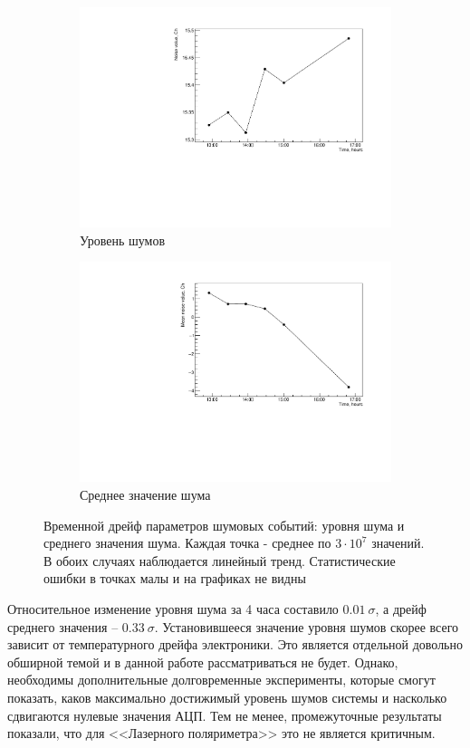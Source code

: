 \begin{figure}[h]
	\centering
	\begin{subfigure}{.5\textwidth}
		\centering
		\includegraphics[width=1\linewidth]{img/Noise_time_drift.pdf}
		\caption{Уровень шумов}
	\end{subfigure}%
	\begin{subfigure}{.5\textwidth}
		\centering
		\includegraphics[width=1\linewidth]{img/Mean_time_drift.pdf}
		\caption{Среднее значение шума}
	\end{subfigure}
	\caption{Временной дрейф параметров шумовых событий: уровня шума и среднего значения шума. Каждая точка - среднее по $3\cdot10^7$ значений. В обоих случаях наблюдается линейный тренд. Статистические ошибки в точках малы и на графиках не видны}
	\label{fig:Noise_gr}
\end{figure}
Относительное изменение уровня шума за 4 часа составило $0.01~\sigma$, а дрейф среднего значения -- $0.33~\sigma$. Установившееся значение уровня шумов скорее всего зависит от температурного дрейфа электроники. Это является отдельной довольно обширной темой и в данной работе рассматриваться не будет. Однако, необходимы дополнительные долговременные эксперименты, которые смогут показать, каков максимально достижимый уровень шумов системы и насколько сдвигаются нулевые значения АЦП. Тем не менее, промежуточные результаты показали, что для <<Лазерного поляриметра>> это не является критичным.  
